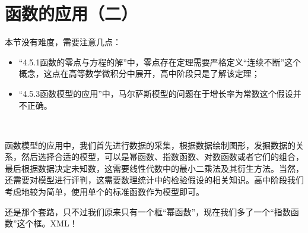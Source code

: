 \section{函数的应用（二）}

本节没有难度，需要注意几点：
\begin{itemize}
    \item “4.5.1函数的零点与方程的解”中，零点存在定理需要严格定义“连续不断”这个概念，这点在高等数学微积分中展开，高中阶段只是了解该定理；
    \item “4.5.3函数模型的应用”中，马尔萨斯模型的问题在于增长率为常数这个假设并不正确。
\end{itemize}

~

函数模型的应用中，我们首先进行数据的采集，根据数据绘制图形，发掘数据的关系，然后选择合适的模型，可以是幂函数、指数函数、对数函数或者它们的组合，最后根据数据决定未知数，这需要线性代数中的最小二乘法及其衍生方法。当然，还需要对模型进行评判，这需要数理统计中的检验假设的相关知识。高中阶段我们考虑地较为简单，使用单个的标准函数作为模型即可。

\begin{tcolorbox}
还是那个套路，只不过我们原来只有一个框“幂函数”，现在我们多了一个“指数函数”这个框。XML！
\end{tcolorbox}




